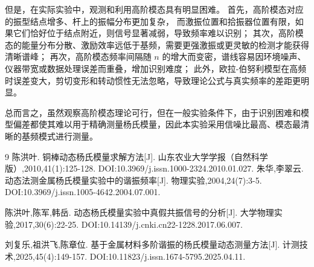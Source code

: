 \documentclass{Phyport}
\begin{document}
但是，在实际实验中，观测和利用高阶模态具有明显困难。
首先，高阶模态对应的振型结点增多、杆上的振幅分布更加复杂，
而激振位置和拾振器位置有限，如果它们恰好位于结点附近，则信号显著减弱，导致频率难以识别；
其次，高阶模态的能量分布分散、激励效率远低于基频，需要更强激振或更灵敏的检测才能获得清晰谱峰；
再次，高阶模态频率间隔随 $n$ 的增大而变密，谱线容易因环境噪声、仪器带宽或数据处理误差而重叠，增加识别难度；
此外，欧拉-伯努利模型在高频时误差变大，剪切变形和转动惯性无法忽略，导致理论公式与真实频率的差距更明显。

总而言之，虽然观察高阶模态理论可行，但在一般实验条件下，由于识别困难和模型偏差都使其难以用于精确测量杨氏模量，因此本实验采用信噪比最高、模态最清晰的基频模式进行测量。


\begin{thebibliography}{9}
    陈洪叶. 铜棒动态杨氏模量求解方法[J]. 山东农业大学学报（自然科学版）,2010,41(1):125-128. DOI:10.3969/j.issn.1000-2324.2010.01.027. 
    朱华,李翠云. 动态法测金属杨氏模量实验中的谐振频率[J]. 物理实验,2004,24(7):3-5. DOI:10.3969/j.issn.1005-4642.2004.07.001. 
    
    陈洪叶,陈军,韩岳. 动态杨氏模量实验中真假共振信号的分析[J]. 大学物理实验,2017,30(6):22-25. DOI:10.14139/j.cnki.cn22-1228.2017.06.007. 

    刘复乐,祖洪飞,陈章位. 基于金属材料多阶谐振的杨氏模量动态测量方法[J]. 计测技术,2025,45(4):149-157. DOI:10.11823/j.issn.1674-5795.2025.04.11. 

\end{thebibliography}


\end{document}
